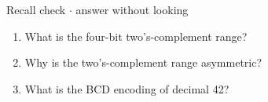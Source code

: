 \documentclass[11pt]{article}
\begin{document}
\begin{keepsection}
\begin{keepsection}
\begin{recallbox}{Recall check \ensuremath{\cdot} answer without looking}
\begin{enumerate}
\item What is the four-bit two’s-complement range?
\item Why is the two’s-complement range asymmetric?
\item What is the BCD encoding of decimal 42?
\end{enumerate}

\end{recallbox}
\end{keepsection}
\end{keepsection}
\end{document}
